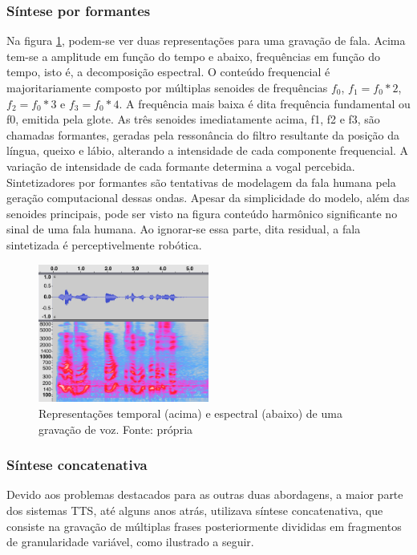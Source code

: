 \subsubsection{Síntese por formantes}
\label{formant}
Na figura \ref{fig:spectrum}, podem-se ver duas representações para uma gravação de
fala. Acima tem-se a amplitude em função do tempo e abaixo, frequências em
função do tempo, isto é, a decomposição espectral. O conteúdo frequencial é
majoritariamente composto por múltiplas senoides de frequências $ f_0 $, $ f_1 =
f_0 * 2 $, $ f_2 = f_0 * 3 $ e $ f_3 = f_0 * 4 $. A frequência mais baixa é dita
frequência fundamental ou f0, emitida pela glote. As três senoides imediatamente
acima, f1, f2 e f3, são chamadas formantes, geradas pela ressonância do filtro
resultante da posição da língua, queixo e lábio, alterando a intensidade de cada
componente frequencial. A variação de intensidade de cada formante determina a
vogal percebida. Sintetizadores por formantes são tentativas de modelagem da
fala humana pela geração computacional dessas ondas. Apesar da simplicidade do
modelo, além das senoides principais, pode ser visto na figura conteúdo
harmônico significante no sinal de uma fala humana. Ao ignorar-se essa parte,
dita residual, a fala sintetizada é perceptivelmente robótica.

\begin{figure}
  \centering
    \includegraphics[width=0.5\textwidth]{Imagens/espectro.png}
  \caption[Representações temporal e espectral de uma gravação de voz]{Representações temporal (acima) e espectral (abaixo) de uma gravação de voz. Fonte: própria}
  \label{fig:spectrum}
\end{figure}


\subsubsection{Síntese concatenativa}
Devido aos problemas destacados para as outras duas abordagens, a maior parte
dos sistemas TTS, até alguns anos atrás, utilizava síntese concatenativa, que
consiste na gravação de múltiplas frases posteriormente divididas
em fragmentos de granularidade variável, como ilustrado a seguir.

